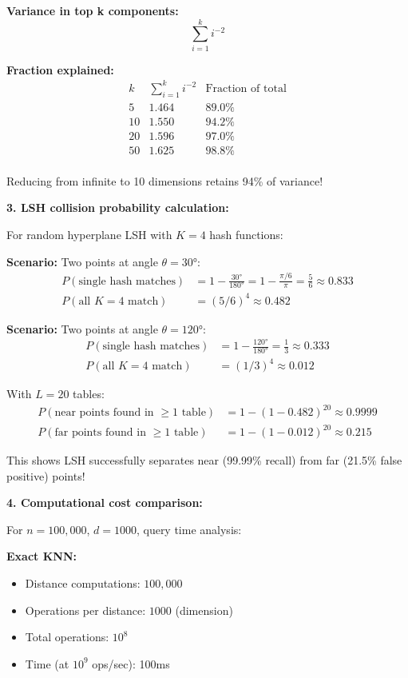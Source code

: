 \documentclass[12pt]{article}
\begin{document}
\begin{computation}
\textbf{Variance in top k components:}
\[
\sum_{i=1}^{k} i^{-2}
\]

\textbf{Fraction explained:}
\[
\begin{array}{c|c|c}
k & \sum_{i=1}^{k} i^{-2} & \text{Fraction of total} \\
\hline
5 & 1.464 & 89.0\% \\
10 & 1.550 & 94.2\% \\
20 & 1.596 & 97.0\% \\
50 & 1.625 & 98.8\% \\
\end{array}
\]

Reducing from infinite to 10 dimensions retains 94\% of variance!

\textbf{3. LSH collision probability calculation:}

For random hyperplane LSH with \(K=4\) hash functions:

\textbf{Scenario:} Two points at angle \(\theta = 30°\):
\begin{align*}
P(\text{single hash matches}) &= 1 - \frac{30°}{180°} = 1 - \frac{\pi/6}{\pi} = \frac{5}{6} \approx 0.833 \\
P(\text{all } K=4 \text{ match}) &= (5/6)^4 \approx 0.482
\end{align*}

\textbf{Scenario:} Two points at angle \(\theta = 120°\):
\begin{align*}
P(\text{single hash matches}) &= 1 - \frac{120°}{180°} = \frac{1}{3} \approx 0.333 \\
P(\text{all } K=4 \text{ match}) &= (1/3)^4 \approx 0.012
\end{align*}

With \(L=20\) tables:
\begin{align*}
P(\text{near points found in } \geq 1 \text{ table}) &= 1 - (1-0.482)^{20} \approx 0.9999 \\
P(\text{far points found in } \geq 1 \text{ table}) &= 1 - (1-0.012)^{20} \approx 0.215
\end{align*}

This shows LSH successfully separates near (99.99\% recall) from far (21.5\% false positive) points!

\textbf{4. Computational cost comparison:}

For \(n=100,000\), \(d=1000\), query time analysis:

\textbf{Exact KNN:}
\begin{itemize}
    \item Distance computations: \(100,000\)
    \item Operations per distance: \(1000\) (dimension)
    \item Total operations: \(10^8\)
    \item Time (at \(10^9\) ops/sec): 100ms
\end{itemize}


\end{computation}
\end{document}
